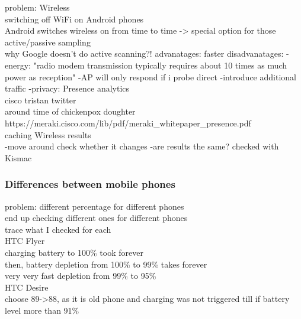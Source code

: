 problem: Wireless\\
	switching off WiFi on Android phones\\
		Android switches wireless on from time to time -> special option for those \\
		
	active/passive sampling\\
		why Google doesn't do active scanning?!
			advanatages: faster
			disadvanatages: 
				-energy:
					"radio modem transmission typically requires about 10 times as much power as reception"
				-AP will only respond if i probe direct 
				-introduce additional  traffic
				-privacy:
					Presence analytics\\
						cisco tristan twitter\\
							around time of chickenpox doughter\\
							https://meraki.cisco.com/lib/pdf/meraki\_whitepaper\_presence.pdf\\
				
				
	caching Wireless results\\
		-move around check whether it changes
			-are results the same?
		checked with Kismac

\subsubsection{Differences between mobile phones}
problem: different percentage for different phones\\
	end up checking different ones for different phones\\
		trace what I checked for each\\
		HTC Flyer\\
			charging battery to 100\% took forever\\
			then, battery depletion from 100\% to 99\% takes forever\\
			very very fast depletion from 99\% to 95\%\\
		HTC Desire\\
			choose 89->88, as it is old phone and charging was not triggered till if battery level more than 91\%\\
		
